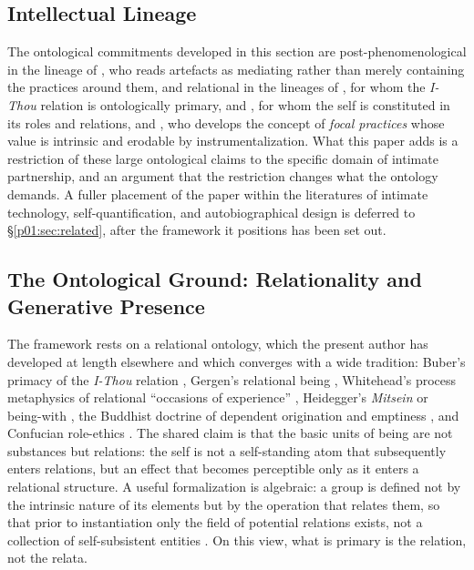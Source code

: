 \subsection{Intellectual Lineage}\label{p01:sec:lineage}

The ontological commitments developed in this section are post-phenomenological in the lineage of \textcite{verbeek2005things}, who reads artefacts as mediating rather than merely containing the practices around them, and relational in the lineages of \textcite{buber1937iandthou}, for whom the \emph{I-Thou} relation is ontologically primary, \textcite{ames2011confucian} and \textcite{tu1985confucian}, for whom the self is constituted in its roles and relations, and \textcite{borgmann1984technology}, who develops the concept of \emph{focal practices} whose value is intrinsic and erodable by instrumentalization. What this paper adds is a restriction of these large ontological claims to the specific domain of intimate partnership, and an argument that the restriction changes what the ontology demands. A fuller placement of the paper within the literatures of intimate technology, self-quantification, and autobiographical design is deferred to §\ref{p01:sec:related}, after the framework it positions has been set out.

\subsection{The Ontological Ground: Relationality and Generative Presence}\label{p01:sec:ontology}

The framework rests on a relational ontology, which the present author has developed at length elsewhere \parencite{huang2025relational} and which converges with a wide tradition: Buber's primacy of the \emph{I-Thou} relation \parencite{buber1937iandthou}, Gergen's relational being \parencite{gergen2009relational}, Whitehead's process metaphysics of relational ``occasions of experience'' \parencite{whitehead1978process}, Heidegger's \emph{Mitsein} or being-with \parencite{heidegger1962being}, the Buddhist doctrine of dependent origination and emptiness \parencite{nagarjuna1995mulamadhyamakakarika}, and Confucian role-ethics \parencite{ames2011confucian}. The shared claim is that the basic units of being are not substances but relations: the self is not a self-standing atom that subsequently enters relations, but an effect that becomes perceptible only as it enters a relational structure. A useful formalization is algebraic: a group is defined not by the intrinsic nature of its elements but by the operation that relates them, so that prior to instantiation only the field of potential relations exists, not a collection of self-subsistent entities \parencite{huang2025relational}. On this view, what is primary is the relation, not the relata.

